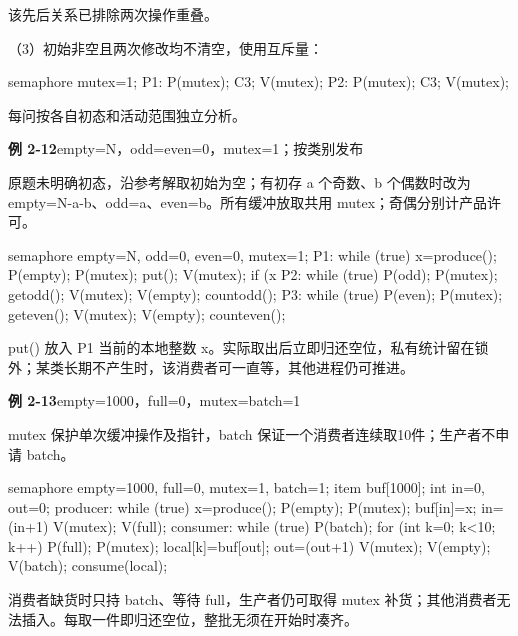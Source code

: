 \documentclass{sidenotes-simplex}
\begin{document}
该先后关系已排除两次操作重叠。

（3）初始非空且两次修改均不清空，使用互斥量：

\begin{codeblock}[language={}]
semaphore mutex=1;
P1: P(mutex); C3; V(mutex);
P2: P(mutex); C3; V(mutex);
\end{codeblock}

每问按各自初态和活动范围独立分析。

\par\medskip\Needspace{30.00mm}\noindent{}\label{a:OS02-E12}\textbf{例 2-12}\quad empty=N，odd=even=0，mutex=1；按类别发布
\par\smallskip
原题未明确初态，沿参考解取初始为空；有初存 a 个奇数、b 个偶数时改为 empty=N-a-b、odd=a、even=b。所有缓冲放取共用 mutex；奇偶分别计产品许可。

\begin{codeblock}[language={}]
semaphore empty=N, odd=0, even=0, mutex=1;
P1: while (true) {
    x=produce();
    P(empty); P(mutex); put(); V(mutex);
    if (x%
}
P2: while (true) {
    P(odd); P(mutex); getodd(); V(mutex);
    V(empty); countodd();
}
P3: while (true) {
    P(even); P(mutex); geteven(); V(mutex);
    V(empty); counteven();
}
\end{codeblock}

put() 放入 P1 当前的本地整数 x。实际取出后立即归还空位，私有统计留在锁外；某类长期不产生时，该消费者可一直等，其他进程仍可推进。

\par\medskip\Needspace{30.00mm}\noindent{}\label{a:OS02-E13}\textbf{例 2-13}\quad empty=1000，full=0，mutex=batch=1
\par\smallskip
mutex 保护单次缓冲操作及指针，batch 保证一个消费者连续取10件；生产者不申请 batch。

\begin{codeblock}[language={}]
semaphore empty=1000, full=0, mutex=1, batch=1;
item buf[1000]; int in=0, out=0;
producer: while (true) {
    x=produce(); P(empty); P(mutex);
    buf[in]=x; in=(in+1)%
    V(mutex); V(full);
}
consumer: while (true) {
    P(batch);
    for (int k=0; k<10; k++) {
        P(full); P(mutex);
        local[k]=buf[out]; out=(out+1)%
        V(mutex); V(empty);
    }
    V(batch); consume(local);
}
\end{codeblock}

消费者缺货时只持 batch、等待 full，生产者仍可取得 mutex 补货；其他消费者无法插入。每取一件即归还空位，整批无须在开始时凑齐。
\end{document}
